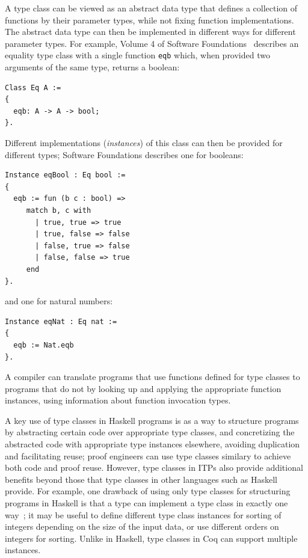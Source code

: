 A type class can be viewed as an abstract data type that defines a collection of functions by their parameter types, while not fixing function implementations. The abstract data type can then be implemented in different ways for different parameter types. For example, Volume 4 of Software Foundations~\citep{Pierce-al:SF} describes an
equality type class with a single function \texttt{eqb} which, when provided two arguments of the same type, returns a boolean:
\begin{lstlisting}
Class Eq A :=
{
  eqb: A -> A -> bool;
}.
\end{lstlisting}
Different implementations (\emph{instances}) of this class can then be provided for different types;
Software Foundations describes one for booleans:
\begin{lstlisting}
Instance eqBool : Eq bool :=
{
  eqb := fun (b c : bool) =>
     match b, c with
       | true, true => true
       | true, false => false
       | false, true => false
       | false, false => true
     end
}.
\end{lstlisting}
and one for natural numbers:
\begin{lstlisting}
Instance eqNat : Eq nat :=
{
  eqb := Nat.eqb
}.
\end{lstlisting}
A compiler can translate programs that use functions defined for type classes to programs that do not by looking up and applying the appropriate function instances, using information about function invocation types.

A key use of type classes in Haskell programs is as a way to structure programs by abstracting certain code over appropriate type classes, and concretizing the abstracted code with appropriate type instances elsewhere, avoiding duplication and facilitating reuse;
proof engineers can use type classes similary to achieve both code and proof reuse.
However, type classes in ITPs also provide additional benefits beyond those that type classes in other languages such as Haskell provide.
For example, one drawback of using only type classes for structuring programs in Haskell is that a type can implement a type class in exactly one way~\citep{HarperModules2011};
it may be useful to define different type class instances for sorting of integers depending on the size of the input data, or use different orders on integers for sorting.
Unlike in Haskell, type classes in Coq can support multiple instances.

